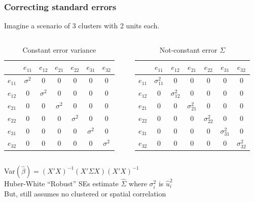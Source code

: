 \documentclass{beamer}
\begin{document}
\begin{frame}
\frametitle{Correcting standard errors}
Imagine a scenario of 3 clusters with 2 units each.
\begin{columns}[T] %
\begin{column}{.48\textwidth}
\begin{table}[h]
\caption{Constant error variance}
\resizebox{\linewidth} {\height}{%
    \setlength\tabcolsep{2pt}%
\begin{tabular}{ c|c c c c c c|}
 		 &  $e_{11}$ & $e_{12}$ & $e_{21}$ & $e_{22}$ & $e_{31}$ & $e_{32}$\\ \hline
$e_{11}$ & $\sigma^2$ & 0 	   & 0 		  & 0 		 & 0 		& 0 		\\
$e_{12}$ & 0  		 & $\sigma^2$ & 0 		  & 0 		 & 0 		& 0 		\\
$e_{21}$ & 0			 & 0 	   & $\sigma^2$ & 0 		 & 0 		& 0 		\\
$e_{22}$ & 0			 & 0 	   & 0 		  & $\sigma^2$ & 0 		& 0 		\\
$e_{31}$ & 0			 & 0 	   & 0 		  & 0 		 & $\sigma^2$ & 0 		\\
$e_{32}$ & 0			 & 0 	   & 0 		  & 0 		 & 0 		& $\sigma^2$ \\ \hline
\end{tabular}}
\end{table}
\end{column}%
\hfill%
\begin{column}{.48\textwidth}
\begin{table}[h]
\caption{Not-constant error $\Sigma$}
\resizebox{\linewidth} {\height}{%
    \setlength\tabcolsep{2pt}%
\begin{tabular}{ c|c c c c c c|}
 		 &  $e_{11}$ & $e_{12}$ & $e_{21}$ & $e_{22}$ & $e_{31}$ & $e_{32}$\\ \hline
$e_{11}$ & $\sigma_{11}^2$ & 0 	   & 0 		  & 0 		 & 0 		& 0 		\\
$e_{12}$ & 0  		 & $\sigma_{12}^2$ & 0 		  & 0 		 & 0 		& 0 		\\
$e_{21}$ & 0			 & 0 	   & $\sigma_{21}^2$ & 0 		 & 0 		& 0 		\\
$e_{22}$ & 0			 & 0 	   & 0 		  & $\sigma_{22}^2$ & 0 		& 0 		\\
$e_{31}$ & 0			 & 0 	   & 0 		  & 0 		 & $\sigma_{31}^2$ & 0 		\\
$e_{32}$ & 0			 & 0 	   & 0 		  & 0 		 & 0 		& $\sigma_{32}^2$ \\ \hline
\end{tabular}}
\end{table}
\end{column}%
\end{columns}
Var$(\hat{\beta})=(X'X)^{-1}(X' \Sigma X)(X'X)^{-1}$\\
Huber-White ``Robust'' SEs estimate $\hat{\Sigma}$ where $\sigma_i^2$ is $\hat{u}_i^2$ \\
But, still assumes no clustered or spatial correlation
\end{frame}
\end{document}
